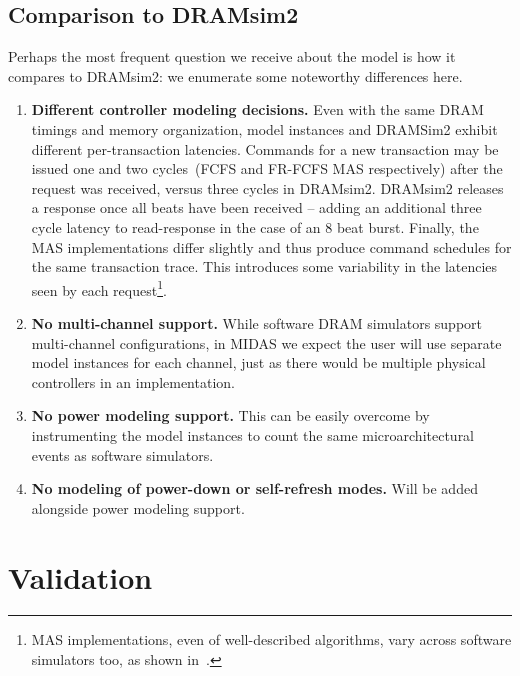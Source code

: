 \subsection{Comparison to DRAMsim2}

Perhaps the most frequent question we receive about the model is how it
compares to DRAMsim2: we enumerate some noteworthy differences here.

\begin{enumerate}
    \item \textbf{Different controller modeling decisions.} Even with the same
        DRAM timings and memory organization, model instances and
        DRAMSim2 exhibit different per-transaction latencies. Commands for a
        new transaction may be issued one and two cycles~(FCFS and FR-FCFS MAS
        respectively) after the request was received, versus three cycles in
        DRAMsim2. DRAMsim2 releases a response once all beats have been
        received -- adding an additional three cycle latency to read-response
        in the case of an 8 beat burst. Finally, the MAS implementations differ
        slightly and thus produce command schedules for the same transaction
        trace. This introduces some variability in the latencies seen by each
        request\footnote{MAS implementations, even of well-described
        algorithms, vary across software simulators too, as shown
        in~\cite{ramulator}.}.

    \item \textbf{No multi-channel support.} While software DRAM simulators
        support multi-channel configurations, in MIDAS we expect the user will
        use separate model instances for each channel, just as there would be
        multiple physical controllers in an implementation.

    \item \textbf{No power modeling support.} This can be easily overcome by
        instrumenting the model instances to count the same microarchitectural events
        as software simulators.

    \item \textbf{No modeling of power-down or self-refresh modes.} Will be
        added alongside power modeling support.

\end{enumerate}

\section{Validation}

